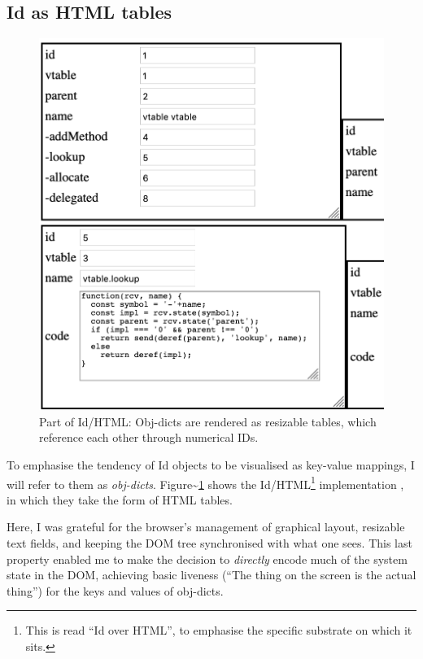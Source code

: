 \hypertarget{id-as-html-tables}{%
\subsection{Id as HTML tables}\label{id-as-html-tables}}

\begin{figure}
  \centering
  \includegraphics[width=\linewidth]{orom-html.png}
  \caption{Part of Id{}/HTML: Obj-dicts are rendered as resizable tables, which reference
           each other through numerical IDs. \label{fig:orom-html}}
\end{figure}

To emphasise the tendency of Id{} objects to be visualised as key-value
mappings, I will refer to them as \emph{obj-dicts}.
Figure\textasciitilde{}\ref{fig:orom-html} shows the Id{}/HTML\footnote{This
  is read ``Id over HTML'', to emphasise the specific substrate on which
  it sits.} implementation \cite{orom-html}, in which they take the form
of HTML tables.

Here, I was grateful for the browser's management of graphical layout,
resizable text fields, and keeping the DOM tree synchronised with what
one sees. This last property enabled me to make the decision to
\emph{directly} encode much of the system state in the DOM, achieving
basic liveness (``The thing on the screen is the actual thing'') for the
keys and values of obj-dicts.

